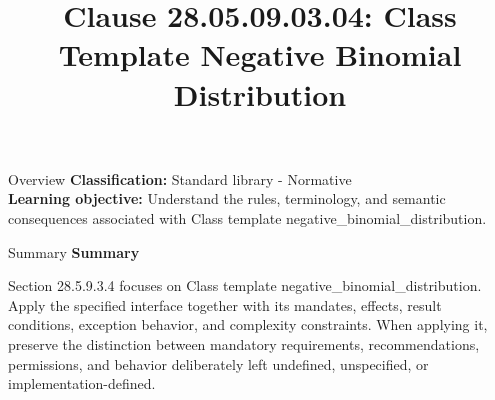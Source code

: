 \documentclass[10pt,letterpaper]{article}
\title{Clause 28.05.09.03.04: Class Template Negative Binomial Distribution}
\author{}
\date{}
\begin{document}
\maketitle
\begin{CornellOverviewBox}{Overview}
\textbf{Classification:} Standard library - Normative\\[2pt]
\textbf{Learning objective:} Understand the rules, terminology, and semantic consequences associated with Class template negative\_binomial\_distribution.
\end{CornellOverviewBox}\begin{CornellSummaryBox}{Summary}
{\sffamily\bfseries\color{Accent} Summary}\par\vspace{3pt}Section 28.5.9.3.4 focuses on Class template negative\_binomial\_distribution. Apply the specified interface together with its mandates, effects, result conditions, exception behavior, and complexity constraints. When applying it, preserve the distinction between mandatory requirements, recommendations, permissions, and behavior deliberately left undefined, unspecified, or implementation-defined.
\end{CornellSummaryBox}
\end{document}
